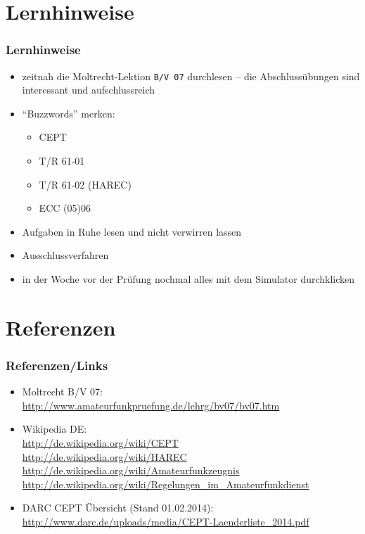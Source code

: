 \section{Lernhinweise}

\begin{frame}
    \frametitle{Lernhinweise}

    \begin{itemize}
        \item zeitnah die Moltrecht-Lektion \texttt{B/V 07} durchlesen -- die
              Abschlussübungen sind interessant und aufschlussreich
        \item ``Buzzwords'' merken:
        \begin{itemize}
            \item CEPT
            \item T/R 61-01
            \item T/R 61-02 (HAREC)
            \item ECC (05)06
        \end{itemize}
        \item Aufgaben in Ruhe lesen und nicht verwirren lassen
        \item Ausschlussverfahren
        \item in der Woche vor der Prüfung nochmal alles mit dem Simulator durchklicken
    \end{itemize}

\end{frame}

\section{Referenzen}

\begin{frame}
    \frametitle{Referenzen/Links}
    
    \footnotesize
    \begin{itemize}
        \item Moltrecht B/V 07: \\
              \url{http://www.amateurfunkpruefung.de/lehrg/bv07/bv07.htm}
        \item Wikipedia DE: \\
              \url{http://de.wikipedia.org/wiki/CEPT} \\
              \url{http://de.wikipedia.org/wiki/HAREC} \\
              \url{http://de.wikipedia.org/wiki/Amateurfunkzeugnis} \\
              \url{http://de.wikipedia.org/wiki/Regelungen_im_Amateurfunkdienst} \\
        \item DARC CEPT Übersicht (Stand 01.02.2014): \\
              \url{http://www.darc.de/uploads/media/CEPT-Laenderliste_2014.pdf}
    \end{itemize}

\end{frame}


